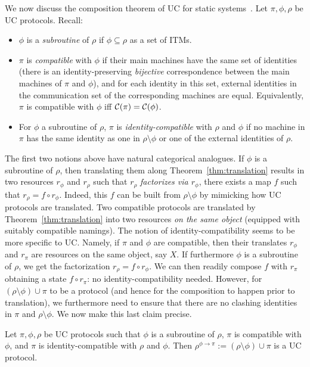 We now discuss the composition theorem of UC for static systems~\cite[Theorem~3]{Can20}.
Let $\pi, \phi, \rho$ be UC protocols. Recall:
\begin{itemize}
    \item $\phi$ is a \emph{subroutine} of $\rho$ if $\phi \subseteq \rho$ as a set of ITMs.
    \item $\pi$ is \emph{compatible} with $\phi$ if their main machines have the same set of identities (\ie there is an identity-preserving \emph{bijective} correspondence between the main machines of $\pi$ and $\phi$), and for each identity in this set, external identities in the communication set of the corresponding machines are equal. Equivalently, $\pi$ is compatible with $\phi$ iff $\mathcal{C}(\pi)=\mathcal{C}(\phi)$.
    \item For $\phi$ a subroutine of $\rho$, $\pi$ is \emph{identity-compatible} with $\rho$ and $\phi$ if no machine in $\pi$ has the same identity as one in $\rho \setminus \phi$ or one of the external identities of $\rho$.
\end{itemize}
The first two notions above have natural categorical analogues.  If $\phi$ is a subroutine of $\rho$, then translating them along Theorem~\ref{thm:translation} results in two resources $r_\phi$ and $r_\rho$ such that $r_\rho$ \emph{factorizes via $r_\phi$}, \ie there exists a map $f$ such that $r_\rho=f\circ r_\phi$. Indeed, this $f$ can be built from $\rho\setminus\phi$ by mimicking how UC protocols are translated. 
Two compatible protocols are translated by Theorem~\ref{thm:translation} into two resources \emph{on the same object} (equipped with suitably compatible namings). The notion of identity-compatibility seems to be more specific to UC. Namely, if $\pi$ and $\phi$ are compatible, then their translates $r_\phi$ and $r_\pi$ are resources on the same object, say $X$. If furthermore $\phi$ is a subroutine of $\rho$, we get the factorization $r_\rho=f\circ r_\phi$. We can then readily compose $f$ with $r_\pi$ obtaining a state $f\circ r_\pi$: no identity-compatibility needed. However, for $(\rho\setminus\phi)\cup\pi$ to be a protocol (and hence for the composition to happen prior to translation), we furthermore need to ensure that there are no clashing identities in $\pi$ and $\rho\setminus\phi$. We now make this last claim precise.

\begin{claim} 
\label{claim:prot}
Let $\pi,\phi,\rho$ be UC protocols such that $\phi$ is  a subroutine of $\rho$, $\pi$ is compatible with $\phi$, and $\pi$ is identity-compatible with $\rho$ and $\phi$. Then $\rho^{\phi\to\pi}:=(\rho\setminus\phi)\cup\pi$ is a UC protocol.
\end{claim}

